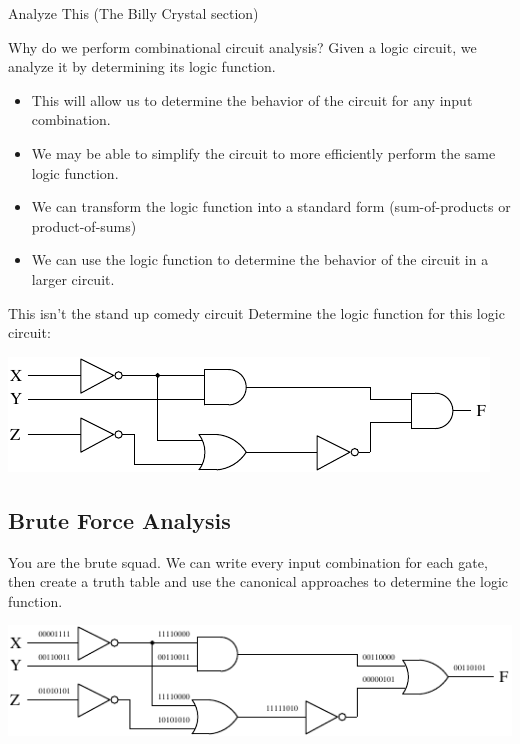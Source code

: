 \begin{frame}{Analyze This (The Billy Crystal section)}
  \begin{block}{Why do we perform combinational circuit analysis?}
    Given a logic circuit, we analyze it by determining its logic function.
    \begin{itemize}
      \item This will allow us to determine the behavior of the circuit for any input combination.
      \item We may be able to simplify the circuit to more efficiently perform the same logic function.
      \item We can transform the logic function into a standard form (sum-of-products or product-of-sums)
      \item We can use the logic function to determine the behavior of the circuit in a larger circuit.
    \end{itemize}
  \end{block}
\end{frame}

\begin{frame}{This isn't the stand up comedy circuit}
  Determine the logic function for this logic circuit:\\
  \begin{center}
    \includegraphics{AnalysisLogicDiagram}
  \end{center}
\end{frame}

\subsection{Brute Force Analysis}

\begin{frame}{You are the brute squad.}
  We can write every input combination for each gate, then create a truth table and use the canonical approaches to determine the logic function.\\
  \begin{center}
    \includegraphics{AnalysisLogicDiagramAllInputs}
  \end{center}
\end{frame}

